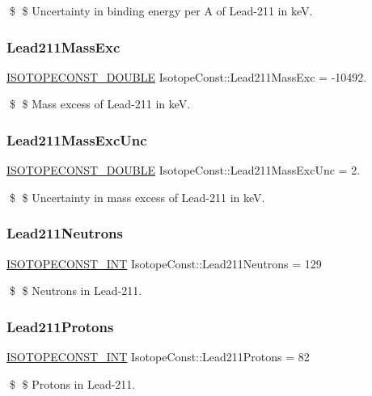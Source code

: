 \$ \$ Uncertainty in binding energy per A of Lead-\/211 in keV. \mbox{\label{group___isotope_const-_lead-_pb211_ga9dc3e5d9cd61f43c4fab028da6054911}} 
\subsubsection{\texorpdfstring{Lead211\+Mass\+Exc}{Lead211MassExc}}
{\footnotesize\ttfamily \mbox{\hyperlink{group___isotope_const-_macros_ga8f45a7272ce02c0b4c65c44636ed719a}{I\+S\+O\+T\+O\+P\+E\+C\+O\+N\+S\+T\+\_\+\+D\+O\+U\+B\+LE}} Isotope\+Const\+::\+Lead211\+Mass\+Exc = -\/10492.}

\$ \$ Mass excess of Lead-\/211 in keV. \mbox{\label{group___isotope_const-_lead-_pb211_ga31b7e4c3ec7356b968c5c309040479cf}} 
\subsubsection{\texorpdfstring{Lead211\+Mass\+Exc\+Unc}{Lead211MassExcUnc}}
{\footnotesize\ttfamily \mbox{\hyperlink{group___isotope_const-_macros_ga8f45a7272ce02c0b4c65c44636ed719a}{I\+S\+O\+T\+O\+P\+E\+C\+O\+N\+S\+T\+\_\+\+D\+O\+U\+B\+LE}} Isotope\+Const\+::\+Lead211\+Mass\+Exc\+Unc = 2.}

\$ \$ Uncertainty in mass excess of Lead-\/211 in keV. \mbox{\label{group___isotope_const-_lead-_pb211_ga6ffd98cd069a2951a2377c730d1941cc}} 
\subsubsection{\texorpdfstring{Lead211\+Neutrons}{Lead211Neutrons}}
{\footnotesize\ttfamily \mbox{\hyperlink{group___isotope_const-_macros_ga5f18360b3e99483a35c32d789e62621c}{I\+S\+O\+T\+O\+P\+E\+C\+O\+N\+S\+T\+\_\+\+I\+NT}} Isotope\+Const\+::\+Lead211\+Neutrons = 129}

\$ \$ Neutrons in Lead-\/211. \mbox{\label{group___isotope_const-_lead-_pb211_gae64b6ea7145562ec58363854b8c2dcf8}} 
\subsubsection{\texorpdfstring{Lead211\+Protons}{Lead211Protons}}
{\footnotesize\ttfamily \mbox{\hyperlink{group___isotope_const-_macros_ga5f18360b3e99483a35c32d789e62621c}{I\+S\+O\+T\+O\+P\+E\+C\+O\+N\+S\+T\+\_\+\+I\+NT}} Isotope\+Const\+::\+Lead211\+Protons = 82}

\$ \$ Protons in Lead-\/211. 